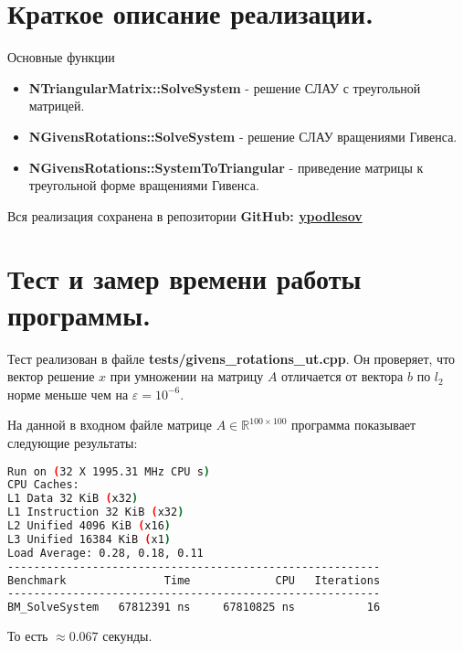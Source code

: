 \documentclass[a4paper,12pt]{article}
\begin{document}
\section*{Краткое описание реализации.}

    Основные функции
    \begin{itemize}
        \item \textbf{NTriangularMatrix::SolveSystem} - решение СЛАУ с треугольной матрицей.
        \item \textbf{NGivensRotations::SolveSystem} - решение СЛАУ вращениями Гивенса.
        \item \textbf{NGivensRotations::SystemToTriangular} - приведение матрицы к треугольной форме вращениями Гивенса.
    \end{itemize}
    
    Вся реализация сохранена в репозитории \textbf{GitHub: \href{https://github.com/ypodlesov}{ypodlesov}}

\section*{Тест и замер времени работы программы.}

    Тест реализован в файле \textbf{tests/givens\_rotations\_ut.cpp}. Он проверяет, что вектор решение $ x $ при умножении на матрицу $ A $ отличается от вектора $ b $ по $l_2$ норме меньше чем на $ \varepsilon = 10^{-6}$. 
    
    На данной в входном файле матрице $ A \in \mathbb{R}^{100 \times 100} $ программа показывает следующие результаты: 

    \begin{lstlisting}[caption=Результаты работы программы, style=chstyle, language=bash]
Run on (32 X 1995.31 MHz CPU s)
CPU Caches:
L1 Data 32 KiB (x32)
L1 Instruction 32 KiB (x32)
L2 Unified 4096 KiB (x16)
L3 Unified 16384 KiB (x1)
Load Average: 0.28, 0.18, 0.11
---------------------------------------------------------
Benchmark               Time             CPU   Iterations
---------------------------------------------------------
BM_SolveSystem   67812391 ns     67810825 ns           16
    \end{lstlisting}

    То есть $ \approx 0.067 $ секунды.
\end{document}
